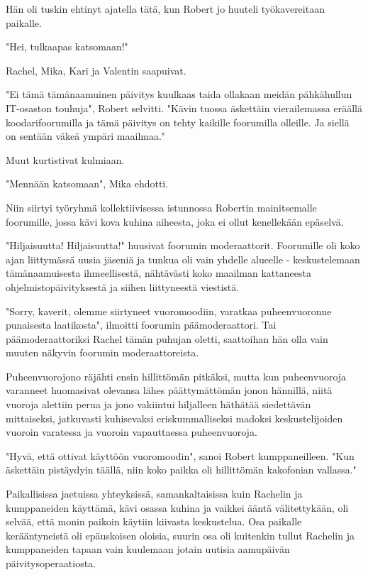 Hän oli tuskin ehtinyt ajatella tätä, kun Robert jo huuteli työkavereitaan paikalle.


"Hei, tulkaapas katsomaan!"


Rachel, Mika, Kari ja Valentin saapuivat.


"Ei tämä tämänaamuinen päivitys kuulkaas taida ollakaan meidän pähkähullun IT-osaston touhuja", Robert selvitti. "Kävin tuossa äskettäin vierailemassa eräällä koodarifoorumilla ja tämä päivitys on tehty kaikille foorumilla olleille. Ja siellä on sentään väkeä ympäri maailmaa."


Muut kurtistivat kulmiaan.


"Mennään katsomaan", Mika ehdotti.


Niin siirtyi työryhmä kollektiivisessa istunnossa Robertin mainitsemalle foorumille, jossa kävi kova kuhina aiheesta, joka ei ollut kenellekään epäselvä.




\psep "Hiljaisuutta! Hiljaisuutta!" huusivat foorumin moderaattorit. Foorumille oli koko ajan liittymässä uusia jäseniä ja tunkua oli vain yhdelle alueelle - keskustelemaan tämänaamuisesta ihmeellisestä, nähtävästi koko maailman kattaneesta ohjelmistopäivityksestä ja siihen liittyneestä viestistä.


"Sorry, kaverit, olemme siirtyneet vuoromoodiin, varatkaa puheenvuoronne punaisesta laatikosta", ilmoitti foorumin päämoderaattori. Tai päämoderaattoriksi Rachel tämän puhujan oletti, saattoihan hän olla vain muuten näkyvin foorumin moderaattoreista.


Puheenvuorojono räjähti ensin hillittömän pitkäksi, mutta kun puheenvuoroja varanneet huomasivat olevansa lähes päättymättömän jonon hännillä, niitä vuoroja alettiin perua ja jono vakiintui hiljalleen häthätää siedettävän mittaiseksi, jatkuvasti kuhisevaksi eriskummalliseksi madoksi keskustelijoiden vuoroin varatessa ja vuoroin vapauttaessa puheenvuoroja.


"Hyvä, että ottivat käyttöön vuoromoodin", sanoi Robert kumppaneilleen. "Kun äskettäin pistäydyin täällä, niin koko paikka oli hillittömän kakofonian vallassa."


Paikallisissa jaetuissa yhteyksissä, samankaltaisissa kuin Rachelin ja kumppaneiden käyttämä, kävi osassa kuhina ja vaikkei ääntä välitettykään, oli selvää, että monin paikoin käytiin kiivasta keskustelua. Osa paikalle kerääntyneistä oli epäuskoisen oloisia, suurin osa oli kuitenkin tullut Rachelin ja kumppaneiden tapaan vain kuulemaan jotain uutisia aamupäivän päivitysoperaatiosta.


